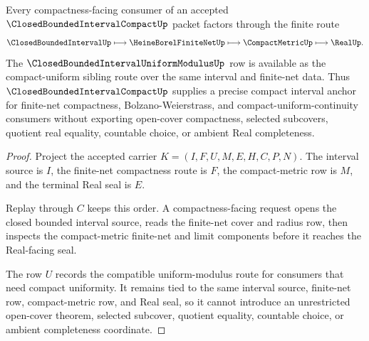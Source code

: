 \begin{theorem}
\label{thm:closed-bounded-interval-compact-finite-net-route}
Every compactness-facing consumer of an accepted $\ClosedBoundedIntervalCompactUp$ packet factors through the finite route
$$
\ClosedBoundedIntervalUp
\longmapsto
\HeineBorelFiniteNetUp
\longmapsto
\CompactMetricUp
\longmapsto
\RealUp .
$$
The $\ClosedBoundedIntervalUniformModulusUp$ row is available as the compact-uniform sibling route over the same interval and finite-net data. Thus $\ClosedBoundedIntervalCompactUp$ supplies a precise compact interval anchor for finite-net compactness, Bolzano-Weierstrass, and compact-uniform-continuity consumers without exporting open-cover compactness, selected subcovers, quotient real equality, countable choice, or ambient Real completeness.
\end{theorem}
\begin{proof}
Project the accepted carrier $K=(I,F,U,M,E,H,C,P,N)$. The interval source is $I$, the finite-net compactness route is $F$, the compact-metric row is $M$, and the terminal Real seal is $E$.

Replay through $C$ keeps this order. A compactness-facing request opens the closed bounded interval source, reads the finite-net cover and radius row, then inspects the compact-metric finite-net and limit components before it reaches the Real-facing seal.

The row $U$ records the compatible uniform-modulus route for consumers that need compact uniformity. It remains tied to the same interval source, finite-net row, compact-metric row, and Real seal, so it cannot introduce an unrestricted open-cover theorem, selected subcover, quotient equality, countable choice, or ambient completeness coordinate.
\end{proof}

